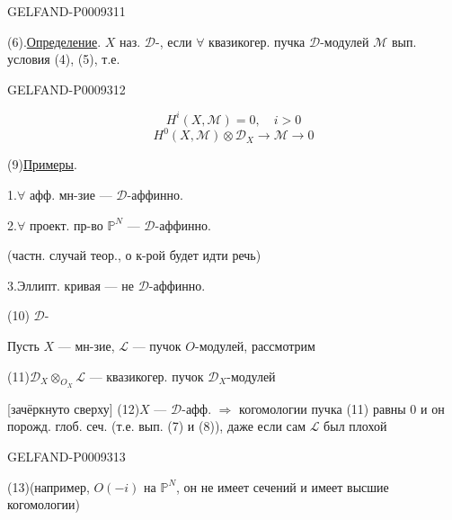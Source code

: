 \begin{GelfandAdjacentEvidence}{GELFAND-P000931}{1}

(6).\quad \underline{Определение}. $X$ наз. $\mathcal D$-, если $\forall$ квазикогер. пучка $\mathcal D$-модулей $\mathcal M$ вып. условия (4), (5), т.е.
\end{GelfandAdjacentEvidence}
\begin{GelfandAdjacentEvidence}{GELFAND-P000931}{2}

\begin{equation*}
 H^i(X,\mathcal M)=0,\quad i>0
 \tag{7}
\end{equation*}
\begin{equation*}
 H^0(X,\mathcal M)\otimes\mathcal D_X\longrightarrow\mathcal M\longrightarrow0
 \tag{8}
\end{equation*}

(9)\quad \underline{Примеры}.

1.\enspace $\forall$ афф. мн-зие --- $\mathcal D$-аффинно.

2.\enspace $\forall$ проект. пр-во $\mathbb P^N$ --- $\mathcal D$-аффинно.

(частн. случай теор., о к-рой будет идти речь)

3.\enspace Эллипт. кривая --- не $\mathcal D$-аффинно.

(10)\quad {} $\mathcal D$-

Пусть $X$ --- мн-зие, $\mathcal L$ --- пучок $O$-модулей, рассмотрим

(11)\quad $\mathcal D_X\otimes_{O_X}\mathcal L$ --- квазикогер. пучок $\mathcal D_X$-модулей

[зачёркнуто сверху]
(12)\quad $X$ --- $\mathcal D$-афф. \(\Rightarrow\) когомологии пучка (11) равны $0$ и он порожд. глоб. сеч. (т.е. вып. (7) и (8)), даже если сам $\mathcal L$ был плохой
\end{GelfandAdjacentEvidence}
\begin{GelfandAdjacentEvidence}{GELFAND-P000931}{3}


(13)\quad (например, $O(-i)$ на $\mathbb P^N$, он не имеет сечений и имеет высшие когомологии)
\end{GelfandAdjacentEvidence}
